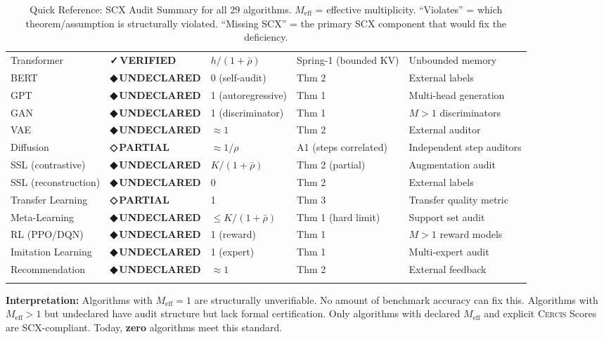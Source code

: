 \documentclass[12pt,a4paper]{article}
\theoremstyle{definition}
\newcommand{\guilty}{{\color{guiltycolor}\textbf{◆\,UNDECLARED}}}
\newcommand{\weakness}{{\color{weakcolor}\textbf{◇\,PARTIAL}}}
\newcommand{\verified}{{\color{verifiedcolor}\textbf{✓\,VERIFIED}}}
\newcommand{\Cercis}{\textsc{Cercis}}
\newcommand{\SCX}{\textsc{SCX}}
\begin{document}
\begin{longtable}{p{3.2cm} p{1.2cm} p{1.2cm} p{2cm} p{3cm}}
Transformer & \verified{} & $h/(1+\bar{\rho})$ & Spring-1 (bounded KV) & Unbounded memory \\
BERT & \guilty{} & 0 (self-audit) & Thm 2 & External labels \\
GPT & \guilty{} & 1 (autoregressive) & Thm 1 & Multi-head generation \\
GAN & \guilty{} & 1 (discriminator) & Thm 1 & $M>1$ discriminators \\
VAE & \guilty{} & $\approx 1$ & Thm 2 & External auditor \\
Diffusion & \weakness{} & $\approx 1/\rho$ & A1 (steps correlated) & Independent step auditors \\
SSL (contrastive) & \guilty{} & $K/(1+\bar{\rho})$ & Thm 2 (partial) & Augmentation audit \\
SSL (reconstruction) & \guilty{} & 0 & Thm 2 & External labels \\
Transfer Learning & \weakness{} & 1 & Thm 3 & Transfer quality metric \\
Meta-Learning & \guilty{} & $\le K/(1+\bar{\rho})$ & Thm 1 (hard limit) & Support set audit \\
RL (PPO/DQN) & \guilty{} & 1 (reward) & Thm 1 & $M>1$ reward models \\
Imitation Learning & \guilty{} & 1 (expert) & Thm 1 & Multi-expert audit \\
Recommendation & \guilty{} & $\approx 1$ & Thm 2 & External feedback \\
\bottomrule
\caption{Quick Reference: SCX Audit Summary for all 29 algorithms. $M_{\text{eff}}$ = effective multiplicity. ``Violates'' = which theorem/assumption is structurally violated. ``Missing SCX'' = the primary SCX component that would fix the deficiency.}
\label{tab:quickref}
\end{longtable}

\noindent\textbf{Interpretation:} Algorithms with $M_{\text{eff}}=1$ are structurally unverifiable. No amount of benchmark accuracy can fix this. Algorithms with $M_{\text{eff}} > 1$ but undeclared have audit structure but lack formal certification. Only algorithms with declared $M_{\text{eff}}$ and explicit \Cercis{} Scores are \SCX{}-compliant. Today, \textbf{zero} algorithms meet this standard.

\vspace{24pt}
\end{document}
